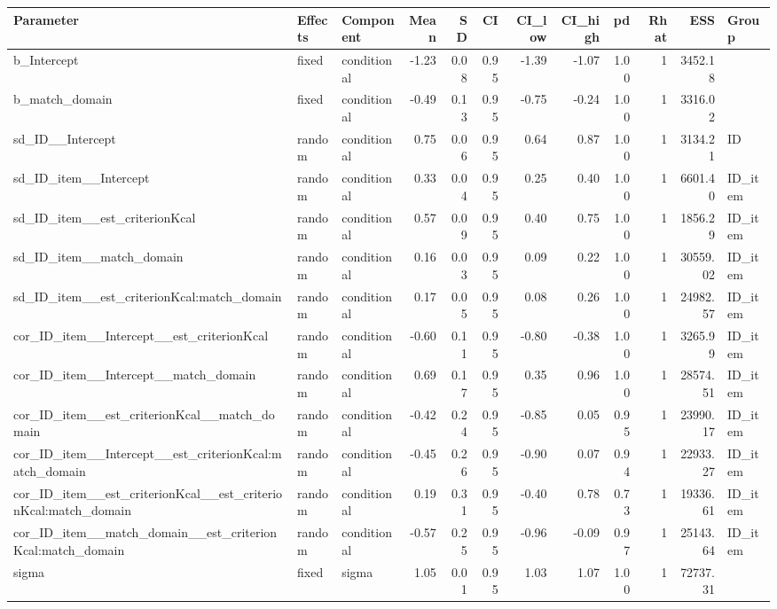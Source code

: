 \documentclass[
  letterpaper,
  DIV=11,
  numbers=noendperiod]{scrartcl}
\begin{document}
\begin{longtable*}[t]{lllrrrrrrrrl}
\toprule
Parameter & Effects & Component & Mean & SD & CI & CI\_low & CI\_high & pd & Rhat & ESS & Group\\
\midrule
b\_Intercept & fixed & conditional & -1.23 & 0.08 & 0.95 & -1.39 & -1.07 & 1.00 & 1 & 3452.18 & \\
b\_match\_domain & fixed & conditional & -0.49 & 0.13 & 0.95 & -0.75 & -0.24 & 1.00 & 1 & 3316.02 & \\
sd\_ID\_\_Intercept & random & conditional & 0.75 & 0.06 & 0.95 & 0.64 & 0.87 & 1.00 & 1 & 3134.21 & ID\\
sd\_ID\_item\_\_Intercept & random & conditional & 0.33 & 0.04 & 0.95 & 0.25 & 0.40 & 1.00 & 1 & 6601.40 & ID\_item\\
sd\_ID\_item\_\_est\_criterionKcal & random & conditional & 0.57 & 0.09 & 0.95 & 0.40 & 0.75 & 1.00 & 1 & 1856.29 & ID\_item\\
\addlinespace
sd\_ID\_item\_\_match\_domain & random & conditional & 0.16 & 0.03 & 0.95 & 0.09 & 0.22 & 1.00 & 1 & 30559.02 & ID\_item\\
sd\_ID\_item\_\_est\_criterionKcal:match\_domain & random & conditional & 0.17 & 0.05 & 0.95 & 0.08 & 0.26 & 1.00 & 1 & 24982.57 & ID\_item\\
cor\_ID\_item\_\_Intercept\_\_est\_criterionKcal & random & conditional & -0.60 & 0.11 & 0.95 & -0.80 & -0.38 & 1.00 & 1 & 3265.99 & ID\_item\\
cor\_ID\_item\_\_Intercept\_\_match\_domain & random & conditional & 0.69 & 0.17 & 0.95 & 0.35 & 0.96 & 1.00 & 1 & 28574.51 & ID\_item\\
cor\_ID\_item\_\_est\_criterionKcal\_\_match\_domain & random & conditional & -0.42 & 0.24 & 0.95 & -0.85 & 0.05 & 0.95 & 1 & 23990.17 & ID\_item\\
\addlinespace
cor\_ID\_item\_\_Intercept\_\_est\_criterionKcal:match\_domain & random & conditional & -0.45 & 0.26 & 0.95 & -0.90 & 0.07 & 0.94 & 1 & 22933.27 & ID\_item\\
cor\_ID\_item\_\_est\_criterionKcal\_\_est\_criterionKcal:match\_domain & random & conditional & 0.19 & 0.31 & 0.95 & -0.40 & 0.78 & 0.73 & 1 & 19336.61 & ID\_item\\
cor\_ID\_item\_\_match\_domain\_\_est\_criterionKcal:match\_domain & random & conditional & -0.57 & 0.25 & 0.95 & -0.96 & -0.09 & 0.97 & 1 & 25143.64 & ID\_item\\
sigma & fixed & sigma & 1.05 & 0.01 & 0.95 & 1.03 & 1.07 & 1.00 & 1 & 72737.31 & \\
\bottomrule
\end{longtable*}
\end{document}
